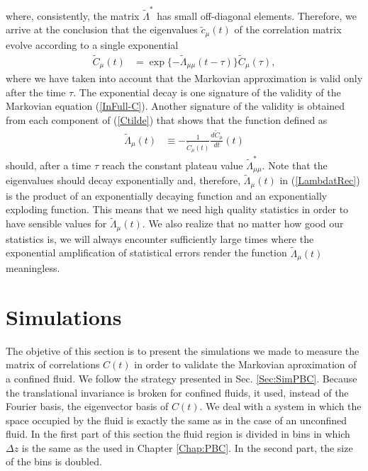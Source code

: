 \documentclass[b5paper,openright,10pt]{book}
\begin{document}
where,   consistently,  the   matrix  $\tilde{\Lambda}^*$   has  small
off-diagonal elements.   Therefore, we  arrive at the  conclusion that
the eigenvalues  $\tilde{c}_\mu(t)$ of  the correlation  matrix evolve
according to a single exponential
\begin{align}
  \tilde{C}_\mu(t)&=\exp\{-\tilde{\Lambda}_{\mu\mu} (t-\tau)\}  \tilde{C}_\mu(\tau),
\end{align}
where we have  taken into account that the  Markovian approximation is
valid  only  after the  time  $\tau$.  The  exponential decay  is  one
signature    of   the    validity    of    the   Markovian    equation
(\ref{InFull-C}). Another  signature of the validity  is obtained from
each component of (\ref{Ctilde}) that  shows that the function defined
as
\begin{align}
  \tilde{\Lambda}_{\mu}(t)&\equiv -\frac{1}{{\tilde{C}}_{\mu}(t)}\frac{d{\tilde{C}}_{\mu}}{dt}(t)
\label{LambdatRec}
\end{align}
should,  after  a time  $\tau$  reach  the  constant plateau  value  $
\tilde{\Lambda}_{\mu\mu}^*$.  Note  that the eigenvalues  should decay
exponentially  and,  therefore,  $  \tilde{\Lambda}_{\mu}(t)$ in (\ref{LambdatRec}) is  the
product  of an  exponentially decaying  function and  an exponentially
exploding function. This means that we need high quality statistics in
order  to have  sensible values  for $  \tilde{\Lambda}_{\mu}(t)$.  We
also realize that no matter how good our statistics is, we will always
encounter sufficiently large times where the exponential amplification
of statistical errors render  the function $ \tilde{\Lambda}_{\mu}(t)$
meaningless.


\section{Simulations}
\label{Sec:SimWALLS}
The objetive of this section is to present the simulations we made to measure the matrix of correlations $C(t)$ in order to validate the Markovian aproximation of a confined fluid. 
We follow the strategy presented in Sec. \ref{Sec:SimPBC}. Because the translational invariance is broken for confined fluids, it used, instead of the Fourier basis, the eigenvector basis of $C(t)$. 
We deal with a system in which the space occupied by the fluid is exactly the same as in the case of an unconfined fluid. In the first part of this section the fluid region is divided in bins in which $\Delta z$ is the same as the used in Chapter \ref{Chap:PBC}. In the second part, the size of the bins is doubled. 
\end{document}
